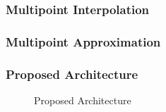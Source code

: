 \documentclass{beamer}
\begin{document}
	\begin{frame}
		\frametitle{Multipoint Interpolation}
	\end{frame}

	\begin{frame}
		\frametitle{Multipoint Approximation}
	\end{frame}


	\begin{frame}
		\frametitle{Proposed Architecture}
		\begin{figure}[hb]
			\centering
			\def\svgwidth{\columnwidth}
			\caption{Proposed Architecture}%
			\label{fig:proposed_architecture}
		\end{figure}
	\end{frame}
\end{document}
